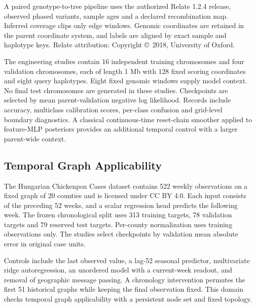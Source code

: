 \documentclass[letterpaper]{article}
\begin{document}
A paired genotype-to-tree pipeline uses the authorized Relate 1.2.4 release, observed phased variants, sample ages and a declared recombination map. Inferred coverage clips only edge windows. Genomic coordinates are retained in the parent coordinate system, and labels are aligned by exact sample and haplotype keys. Relate attribution: Copyright \copyright\ 2018, University of Oxford.

The engineering studies contain 16 independent training chromosomes and four validation chromosomes, each of length 1 Mb with 128 fixed scoring coordinates and eight query haplotypes. Eight fixed genomic windows supply model context. No final test chromosomes are generated in these studies. Checkpoints are selected by mean parent-validation negative log likelihood. Records include accuracy, multiclass calibration scores, per-class confusion and grid-level boundary diagnostics. A classical continuous-time reset-chain smoother applied to feature-MLP posteriors provides an additional temporal control with a larger parent-wide context.

\subsection{Temporal Graph Applicability}
The Hungarian Chickenpox Cases dataset contains 522 weekly observations on a fixed graph of 20 counties and is licensed under CC BY 4.0. Each input consists of the preceding 52 weeks, and a scalar regression head predicts the following week. The frozen chronological split uses 313 training targets, 78 validation targets and 79 reserved test targets. Per-county normalization uses training observations only. The studies select checkpoints by validation mean absolute error in original case units.

Controls include the last observed value, a lag-52 seasonal predictor, multivariate ridge autoregression, an unordered model with a current-week readout, and removal of geographic message passing. A chronology intervention permutes the first 51 historical graphs while keeping the final observation fixed. This domain checks temporal graph applicability with a persistent node set and fixed topology.


\end{document}
